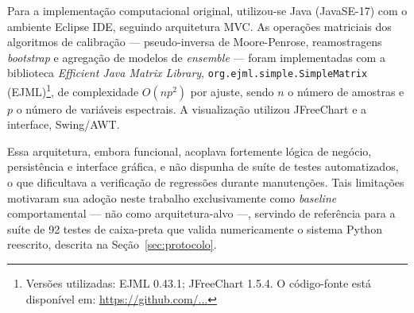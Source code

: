 Para a implementação computacional original, utilizou-se Java (JavaSE-17) com o
ambiente Eclipse IDE, seguindo arquitetura MVC. As operações matriciais dos algoritmos
de calibração --- pseudo-inversa de Moore-Penrose, reamostragens \textit{bootstrap} e
agregação de modelos de \textit{ensemble} --- foram implementadas com a biblioteca
\textit{Efficient Java Matrix Library}, \texttt{org.ejml.simple.SimpleMatrix}
(EJML)\footnote{Versões utilizadas: EJML 0.43.1; JFreeChart 1.5.4. O código-fonte está
disponível em: \url{https://github.com/...}}, de complexidade $O(np^2)$ por ajuste,
sendo $n$ o número de amostras e $p$ o número de variáveis espectrais. A visualização
utilizou JFreeChart e a interface, Swing/AWT.

Essa arquitetura, embora funcional, acoplava fortemente lógica de negócio, persistência
e interface gráfica, e não dispunha de suíte de testes automatizados, o que dificultava
a verificação de regressões durante manutenções. Tais limitações motivaram sua adoção
neste trabalho exclusivamente como \textit{baseline} comportamental --- não como
arquitetura-alvo ---, servindo de referência para a suíte de 92 testes de caixa-preta
que valida numericamente o sistema Python reescrito, descrita na
Seção~\ref{sec:protocolo}.

